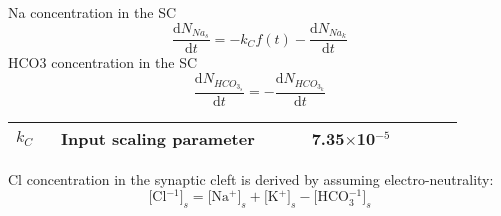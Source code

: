 \documentclass[fleqn]{report}
\numberwithin{equation}{section}
\numberwithin{equation}{section}
\newcommand{\Nas}{\text{[Na$^+]_{s}$}}
\newcommand{\Ks}{\text{[K$^{+}]_s$}}
\newcommand{\Cls}{\text{[Cl$^{-1}]_s$}}
\newcommand{\HCOs}{\text{[HCO$_{3}^{-1}]_s$}}
\begin{document}
		\gls{Na} concentration in the \gls{SC}  
		\begin{equation} \label{eq:NaEx}
		\dfrac{\mathrm{d}N_{Na_s}}{\mathrm{d}t}= - k_C f(t) -\dfrac{\mathrm{d}N_{Na_k}}{\mathrm{d}t}
		\end{equation}
		\gls{HCO3} concentration in the SC  
		\begin{equation} \label{eq:HCOEx}
		\dfrac{\mathrm{d}N_{HCO_{3_{s}}}}{\mathrm{d}t}=-\dfrac{\mathrm{d}N_{HCO_{3_{k}}}}{\mathrm{d}t}
		\end{equation}
		\begin{table}[h!]
		\centering
		\begin{tabular}{ p{0.09\linewidth}  >{\footnotesize} p{0.5\linewidth}  >{\footnotesize} p{0.27\linewidth} >{\footnotesize} p{0.03\linewidth} }
		\hline
		$ k_C $  & Input scaling parameter & 7.35$\times$10$^{-5}$ \muMps & \cite{Ostby2009} \\
		\hline
		\end{tabular}
		\end{table}
		
		\gls{Cl} concentration in the synaptic cleft  is derived by assuming electro-neutrality: 
		\begin{equation} \label{eq:ClEx}
		\Cls= \Nas+\Ks-\HCOs
		\end{equation}
		
	

	
\end{document}
